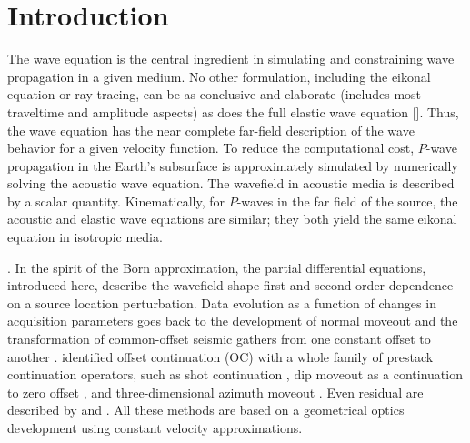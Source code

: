 \section{Introduction}

The wave equation is the central ingredient in simulating and 
constraining wave propagation in a given medium.
No other formulation, including the eikonal equation or ray tracing, can be as conclusive and 
elaborate (includes most traveltime and amplitude 
aspects) as does the full  elastic wave equation [\cite{aki}]. Thus, the wave equation has the near complete far-field description of the wave behavior for a given
velocity function. To reduce the computational cost, $P$-wave propagation in the Earth's subsurface is approximately simulated  by
numerically solving the acoustic wave equation. The wavefield in acoustic media is described by a scalar quantity. Kinematically, for
$P$-waves in the far field of the source, the acoustic and
elastic wave equations are similar; they both yield the same eikonal equation in isotropic media.

 \cite[]{Born1,Born2}. In the spirit of the Born approximation, 
the partial differential equations, introduced here, describe the wavefield shape first and second order dependence on a
source location perturbation. Data evolution as a function of changes in acquisition parameters goes back to the development
of normal moveout and the transformation of common-offset
seismic gathers from one constant offset to another
\cite[]{GPR30-06-08130828}. \cite{GEO61-06-18461858} identified offset
continuation (OC) with a whole family of prestack continuation
operators, such as shot continuation \cite[]{SEG-1993-0673}, dip
moveout as a continuation to zero offset \cite[]{DMObook,GEO61-04-09470963}, and
three-dimensional azimuth moveout \cite[]{GEO63-02-05740588}. Even residual 
 are described by
\cite{GEO69-02-05540561} and \cite{GPR53-01-00010012}. All these methods
are based on a geometrical optics development using constant velocity approximations.

